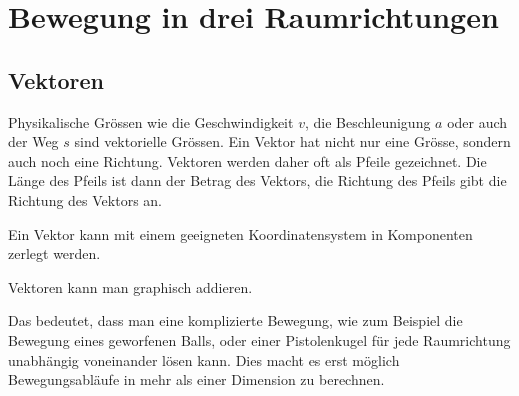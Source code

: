 \section*{Bewegung in drei Raumrichtungen}

\subsection*{Vektoren}
Physikalische Grössen wie die Geschwindigkeit $v$, die Beschleunigung $a$ oder auch der Weg $s$ sind
vektorielle Grössen. Ein Vektor hat nicht nur eine Grösse, sondern auch noch eine Richtung.
Vektoren werden daher oft als Pfeile gezeichnet. Die Länge des Pfeils ist dann der Betrag des Vektors,
die Richtung des Pfeils gibt die Richtung des Vektors an.

Ein Vektor kann mit einem geeigneten Koordinatensystem in Komponenten zerlegt werden.


Vektoren kann man graphisch addieren.

%

Das bedeutet, dass man eine komplizierte Bewegung, wie zum Beispiel die Bewegung eines geworfenen
Balls, oder einer Pistolenkugel für jede Raumrichtung unabhängig voneinander lösen kann.
Dies macht es erst möglich Bewegungsabläufe in mehr als einer Dimension zu berechnen.




